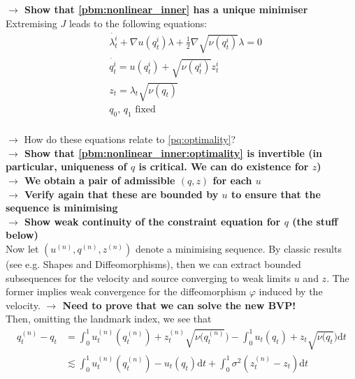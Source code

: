 \documentclass{article}
\newcommand{\half}{\frac 12}
\newcommand{\diff}[1]{\text{d} #1}
\begin{document}
\textbf{$\longrightarrow$ Show that \eqref{pbm:nonlinear_inner} has a unique minimiser}\\

Extremising $J$ leads to the following equations:
\begin{subequations}\label{pbm:nonlinear_inner:optimality}
\begin{align}
& \dot{\lambda_t^i} + \nabla u(q_t^i) \lambda + \half \nabla \sqrt{\nu(q_t^i)} \lambda = 0\\
& \dot{q_t^i} = u(q_t^i) + \sqrt{\nu(q_t^i)} z^i_t\\
& z_t = \lambda_t \sqrt{\nu(q_t)}\\
& q_0,\,q_1\text{ fixed}\\
\end{align}
\end{subequations}

{\color{red} $\longrightarrow$ How do these equations relate to
\eqref{pq:optimality}?}\\
\textbf{$\longrightarrow$ Show that \eqref{pbm:nonlinear_inner:optimality} is
invertible (in particular, uniqueness of $q$ is critical. We can do existence
for $z$)}\\
\textbf{$\longrightarrow$ We obtain a pair of admissible $(q,z)$ for each $u$}\\
\textbf{$\longrightarrow$ Verify again that these are bounded by $u$ to ensure
that the sequence is minimising}\\
\textbf{$\longrightarrow$ Show weak continuity of the constraint equation for
$q$ (the stuff below)}\\

Now let $(u^{(n)}, q^{(n)}, z^{(n)})$ denote a
minimising sequence. By classic results (see e.g.  Shapes and Diffeomorphisms),
then we can extract bounded subsequences for the velocity and source converging
to weak limits $u$ and $z$. The former implies weak
convergence for the diffeomorphism $\varphi$ induced by the velocity. 
\textbf{$\longrightarrow$ Need to prove that we can solve the new BVP!}\\

Then, omitting the landmark index, we see that\\
\begin{align*}
q_t^{(n)} - q_t & = 
\int_0^1u_t^{(n)}(q_t^{(n)})+z_t^{(n)}\sqrt{\nu(q_t^{(n)}}) 
-\int_0^1u_t(q_t)+z_t\sqrt{\nu(q_t})  \diff{t}\\
&\lesssim \int_0^1 u_t^{(n)}(q_t^{(n)}) -  u_t(q_t)\diff{t}+ \int_0^1 \sigma^2 \left(z_t^{(n)} - z_t \right) \diff{t}
\end{align*}
\end{document}
